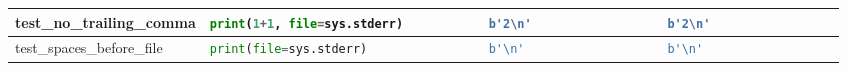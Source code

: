 \begin{table}[ht]
\begin{tabular}{|l|l|l|l|}
    test\_no\_trailing\_comma             & \lstinline[language=Python, style=pythonstyle]|print(1+1, file=sys.stderr)          | & \lstinline[language=Python, style=pythonstyle]|b'2\n'                 | & \lstinline[language=Python, style=pythonstyle]|b'2\n'                 | \\ \hline
    test\_spaces\_before\_file            & \lstinline[language=Python, style=pythonstyle]|print(file=sys.stderr)               | & \lstinline[language=Python, style=pythonstyle]|b'\n'                  | & \lstinline[language=Python, style=pythonstyle]|b'\n'                  | \\ \hline
    \end{tabular}
\end{table}